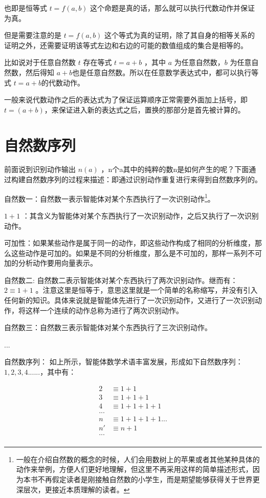 \documentclass[12pt,oneside]{book}
\begin{document}
也即是恒等式 $t=f(a,b)$ 这个命题是真的话，那么就可以执行代数动作并保证为真。

但是需要注意的是 $t=f(a,b)$ 这个等式为真的证明，除了其自身的相等关系的证明之外，还需要证明该等式左边和右边的可能的数值组成的集合是相等的。

比如说对于任意自然数 $t$ 存在等式 $t=a+b$ ，其中 $a$ 为任意自然数，$b$ 为任意自然数，然后得知 $a+b$也是任意自然数。所以在任意数学表达式中，都可以执行等式 $t=a+b$的代数动作。

一般来说代数动作之后的表达式为了保证运算顺序正常需要外面加上括号，即 $t = (a+b)$，来保证进入新的表达式之后，置换的那部分是首先被计算的。



\section{自然数序列}
前面说到识别动作输出 $n(a)$ ，n个a其中的纯粹的数n是如何产生的呢？下面通过构建自然数序列的过程来描述：即通过识别动作重复进行来得到自然数序列的。

自然数一：自然数一表示智能体对某个东西执行了一次识别动作\footnote{一般在介绍自然数的概念的时候，人们会用数树上的苹果或者其他某种具体的动作来举例，方便人们更好地理解，但这里不再采用这样的简单描述形式，因为本书不再假定读者是刚接触自然数的小学生，而是期望能够获得关于世界更深层次，更接近本质理解的读者。}。

$1+1$ ：其含义为智能体对某个东西执行了一次识别动作，之后又执行了一次识别动作。

可加性：如果某些动作是属于同一的动作，即这些动作构成了相同的分析维度，那么这些动作是可加的。如果是不同的分析维度，那么是不可加的，那样一系列不可加的分析动作要用向量表示。

自然数二:  自然数二表示智能体对某个东西执行了两次识别动作。继而有：$2 \equiv 1 + 1$ 。注意这里是恒等于，意思这里就是一个简单的名称缩写，并没有引入任何新的知识。具体来说就是智能体先进行了一次识别动作，又进行了一次识别动作，将这样一个连续的动作总称为进行了两次识别动作。

自然数三：自然数三表示智能体对某个东西执行了三次识别动作。

...

自然数序列： 如上所示，智能体数学术语丰富发展，形成如下自然数序列： $1, 2, 3, 4 ......$，其中有：


\begin{align*}
2 &\equiv 1 + 1 \\
3 &\equiv 1 + 1 + 1 \\
4 &\equiv 1 + 1 + 1 + 1 \\
...\\
n &\equiv 1 + 1 + 1 + 1 ...\\
n' &\equiv n + 1\\
...\\
\end{align*}
\end{document}
